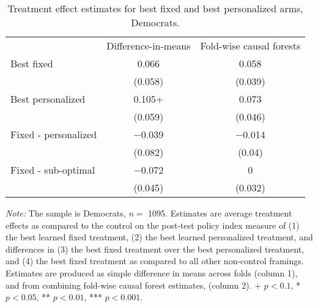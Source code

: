 \begin{table*}

\caption{Treatment effect estimates for best fixed and best personalized arms, Democrats. \label{tab:best_framing_democrats}}
\centering
\begin{threeparttable}
\begin{tabular}[t]{lcc}
\toprule
 & Difference-in-means & Fold-wise causal forests\\
\cmidrule(lr){2-2} \cmidrule(lr){3-3}
Best fixed & \num{0.066} & \num{0.058}\\
 & (\num{0.058}) & (\num{0.039})\\
\addlinespace
Best personalized & \num{0.105}+ & \num{0.073}\\
 & (\num{0.059}) & (\num{0.046})\\
\cmidrule(lr){2-2} \cmidrule(lr){3-3}
\addlinespace
Fixed - personalized & \num{-0.039} & \num{-0.014}\\
 & (\num{0.082}) & (\num{0.04})\\
\addlinespace
Fixed - sub-optimal & \num{-0.072} & \num{0}\\
 & (\num{0.045}) & (\num{0.032})\\
\bottomrule
\end{tabular}
\begin{tablenotes}
\item \footnotesize \textit{Note:} The sample is Democrats, $n = $ \num{1095}. Estimates are average treatment effects as compared to the control on the post-test policy index measure of (1) the best learned fixed treatment, (2) the best learned personalized treatment, and differences in (3) the best fixed treatment over the best personalized treatment, and (4) the best fixed treatment as compared to all other non-control framings. Estimates are produced as simple difference in means across folds (column 1), and from combining fold-wise causal forest estimates, (column 2). + $p < 0.1$, * $p < 0.05$, ** $p < 0.01$, *** $p < 0.001$.
\end{tablenotes}
\end{threeparttable}
\end{table*}
